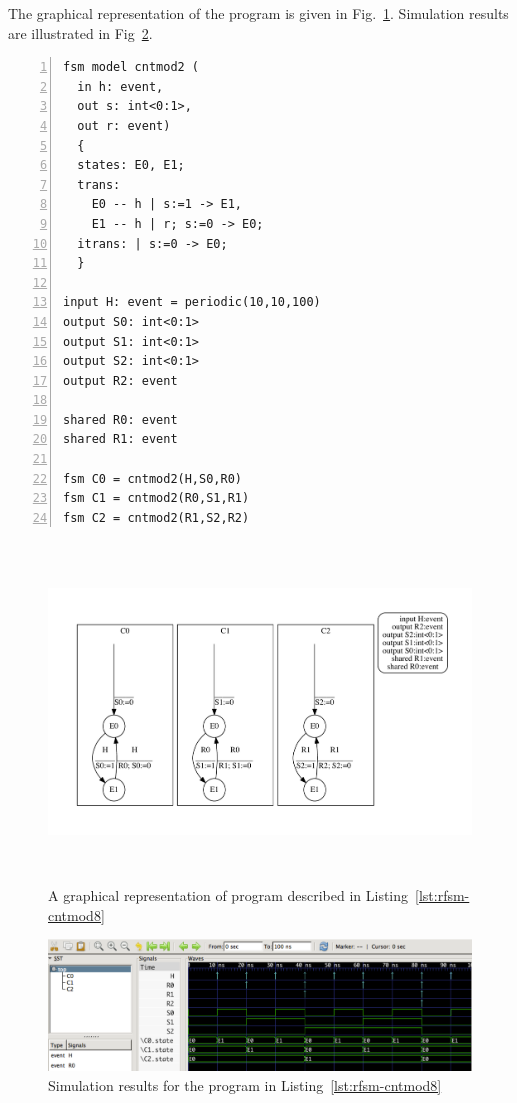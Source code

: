 \medskip
The graphical representation of the program is given in Fig.~\ref{fig:rfsm-cntmod8-top}. Simulation
results are illustrated in Fig~\ref{fig:rfsm-cntmod8-vcd}. 

\begin{lstlisting}[language=Rfsm,frame=single,numbers=left,caption=A multi-model RFSM
  program,label={lst:rfsm-cntmod8},float]
fsm model cntmod2 (
  in h: event,
  out s: int<0:1>,
  out r: event)
  {
  states: E0, E1;
  trans:
    E0 -- h | s:=1 -> E1,
    E1 -- h | r; s:=0 -> E0;
  itrans: | s:=0 -> E0;
  }

input H: event = periodic(10,10,100)
output S0: int<0:1>
output S1: int<0:1>
output S2: int<0:1>
output R2: event

shared R0: event
shared R1: event

fsm C0 = cntmod2(H,S0,R0) 
fsm C1 = cntmod2(R0,S1,R1) 
fsm C2 = cntmod2(R1,S2,R2) 
\end{lstlisting}

\begin{figure}[h]
   \includegraphics[height=9cm]{figs/ctrmod8-top}
   \centering
  \caption{A graphical representation of program described in Listing~\ref{lst:rfsm-cntmod8}}
  \label{fig:rfsm-cntmod8-top}
\end{figure}

\begin{figure}[h]
   \includegraphics[width=\textwidth]{figs/ctrmod8-chrono}
   \centering
  \caption{Simulation results for the program in Listing~\ref{lst:rfsm-cntmod8}}
  \label{fig:rfsm-cntmod8-vcd}
\end{figure}

